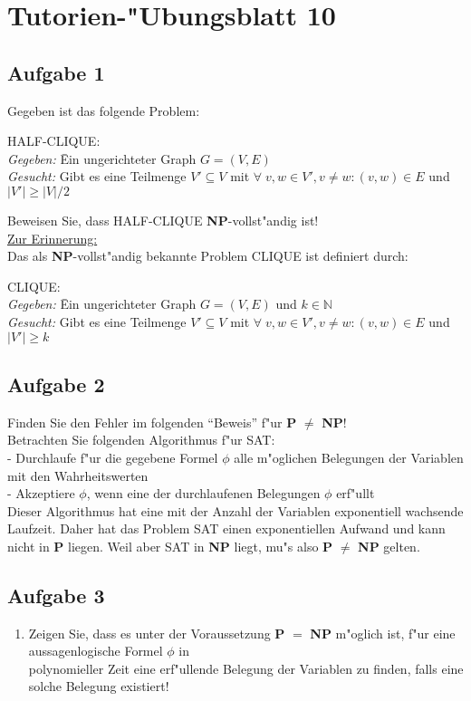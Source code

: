 \documentclass[10pt,oneside,onecolumn,a4paper,german,titlepage]{article}
\begin{document}
\section*{Tutorien-"Ubungsblatt 10}

\subsection*{Aufgabe 1}
Gegeben ist das folgende Problem:
\begin{tabbing}
HALF-CLIQUE:\\
\textit{Gegeben:} \= Ein ungerichteter Graph $G = (V,E)$\\
\textit{Gesucht:} \> Gibt es eine Teilmenge $V' \subseteq V$ mit
$\forall \; v,w \in V', v \not= w: (v,w) \in E$ und $|V'| \geq |V|/2$
\end{tabbing}
Beweisen Sie, dass HALF-CLIQUE \textbf{NP}-vollst"andig ist!\\[4pt]
\underline{Zur Erinnerung:}\\
Das als \textbf{NP}-vollst"andig bekannte Problem CLIQUE ist definiert durch:
\begin{tabbing}
CLIQUE:\\
\textit{Gegeben:} \= Ein ungerichteter Graph $G = (V,E)$ und $k \in \mathbb{N}$\\
\textit{Gesucht:} \> Gibt es eine Teilmenge $V' \subseteq V$ mit
$\forall \; v,w \in V', v \not= w: (v,w) \in E$ und $|V'| \geq k$
\end{tabbing}

\subsection*{Aufgabe 2}
Finden Sie den Fehler im folgenden ``Beweis'' f"ur \textbf{P} $\not=$ \textbf{NP}!\\
Betrachten Sie folgenden Algorithmus f"ur SAT:\\[4pt]
- Durchlaufe f"ur die gegebene Formel $\phi$ alle m"oglichen Belegungen der
Variablen mit den Wahrheitswerten\\
- Akzeptiere $\phi$, wenn eine der durchlaufenen Belegungen $\phi$ erf"ullt\\[4pt]
Dieser Algorithmus hat eine mit der Anzahl der Variablen exponentiell wachsende
Laufzeit. Daher hat das Problem SAT einen exponentiellen Aufwand und kann nicht in
\textbf{P} liegen. Weil aber SAT in \textbf{NP} liegt, mu"s also \textbf{P} $\not=$
\textbf{NP} gelten.

\subsection*{Aufgabe 3}
\begin{enumerate}
\item Zeigen Sie, dass es unter der Voraussetzung \textbf{P} $=$ \textbf{NP} m"oglich
ist, f"ur eine aussagenlogische Formel $\phi$ in\\
polynomieller Zeit eine erf"ullende Belegung der Variablen zu finden, falls eine
solche Belegung existiert!
\end{enumerate}
\end{document}
